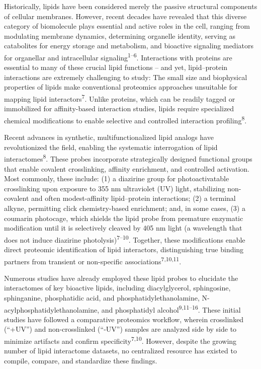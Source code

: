 \documentclass[
  letterpaper,
  DIV=11,
  numbers=noendperiod]{scrartcl}
\begin{document}
Historically, lipids have been considered merely the passive structural
components of cellular membranes. However, recent decades have revealed
that this diverse category of biomolecule plays essential and active
roles in the cell, ranging from modulating membrane dynamics,
determining organelle identity, serving as catabolites for energy
storage and metabolism, and bioactive signaling mediators for organellar
and intracellular signaling\textsuperscript{1--6}. Interactions with
proteins are essential to many of these crucial lipid functions -- and
yet, lipid--protein interactions are extremely challenging to study: The
small size and biophysical properties of lipids make conventional
proteomics approaches unsuitable for mapping lipid
interactors\textsuperscript{7}. Unlike proteins, which can be readily
tagged or immobilized for affinity-based interaction studies, lipids
require specialized chemical modifications to enable selective and
controlled interaction profiling\textsuperscript{8}.

Recent advances in synthetic, multifunctionalized lipid analogs have
revolutionized the field, enabling the systematic interrogation of lipid
interactomes\textsuperscript{8}. These probes incorporate strategically
designed functional groups that enable covalent crosslinking, affinity
enrichment, and controlled activation. Most commonly, these include: (1)
a diazirine group for photoactivatable crosslinking upon exposure to 355
nm ultraviolet (UV) light, stabilizing non-covalent and often
modest-affinity lipid--protein interactions; (2) a terminal alkyne,
permitting click chemistry-based enrichment; and, in some cases, (3) a
coumarin photocage, which shields the lipid probe from premature
enzymatic modification until it is selectively cleaved by 405 nm light
(a wavelength that does not induce diazirine
photolysis)\textsuperscript{7--10}. Together, these modifications enable
direct proteomic identification of lipid interactors, distinguishing
true binding partners from transient or non-specific
associations\textsuperscript{7,10,11}.

Numerous studies have already employed these lipid probes to elucidate
the interactomes of key bioactive lipids, including diacylglycerol,
sphingosine, sphinganine, phosphatidic acid, and
phosphatidylethanolamine, N-acylphosphatidylethanolamine, and
phosphatidyl alcohol\textsuperscript{9,11--16}. These initial studies
have followed a comparative proteomics workflow, wherein crosslinked
(``+UV'') and non-crosslinked (``-UV'') samples are analyzed side by
side to minimize artifacts and confirm
specificity\textsuperscript{7,10}. However, despite the growing number
of lipid interactome datasets, no centralized resource has existed to
compile, compare, and standardize these findings.
\end{document}
